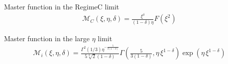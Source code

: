 \documentclass[letterpaper,10pt,english]{sphinxmanual}
\begin{document}
\begin{fulllineitems}
\label{\detokenize{diffsph.spectra:diffsph.spectra.analytics.M_C}}
\pysigstartsignatures
{}
\pysigstopsignatures
\sphinxAtStartPar
Master function in the Regime\sphinxhyphen{}C limit
\begin{equation*}
\begin{split}\mathcal M_C(\xi,\eta,\delta) = \frac{\xi^\delta}{(1-\delta)\eta} F(\xi^2)\end{split}
\end{equation*}
\end{fulllineitems}


\begin{fulllineitems}
\label{\detokenize{diffsph.spectra:diffsph.spectra.analytics.M_i}}
\pysigstartsignatures
{}
\pysigstopsignatures
\sphinxAtStartPar
Master function in the large \(\eta\) limit
\begin{equation*}
\begin{split}\mathcal M_i(\xi,\eta,\delta) = \frac{\Gamma^2(1/3)\eta^{-\frac{5}{3(1-\delta)}}}{5\sqrt[3]{2}(1-\delta)}\Gamma\left(\frac{5}{3(1-\delta)},\eta\, \xi^{1 - \delta}\right)\exp\left(\eta\,  \xi^{1-\delta}\right)\end{split}
\end{equation*}
\end{fulllineitems}

\end{document}

